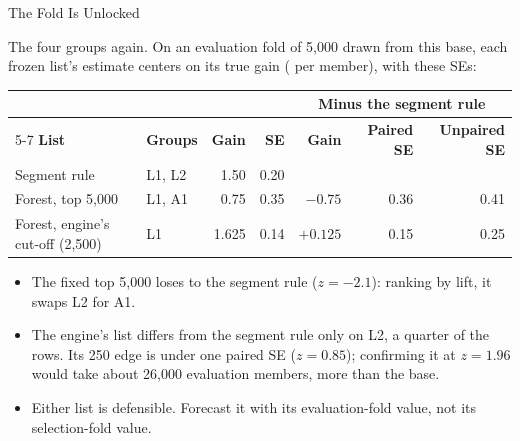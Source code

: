 \documentclass[aspectratio=169, 11pt, handout]{beamer}
\begin{document}
\begin{frame}{The Fold Is Unlocked}

The four groups again. On an evaluation fold of 5{,}000 drawn from this base, each frozen list's estimate centers on its true gain (\textyen{} per member), with these SEs:

\begin{center}
\small
\begin{tabular}{llrrrrr}
\toprule
& & & & \multicolumn{3}{c}{\textbf{Minus the segment rule}} \\
\cmidrule(lr){5-7}
\textbf{List} & \textbf{Groups} & \textbf{Gain} & \textbf{SE} & \textbf{Gain} & \textbf{Paired SE} & \textbf{Unpaired SE} \\
\midrule
Segment rule & L1, L2 & 1.50 & 0.20 & & & \\
Forest, top 5{,}000 & L1, A1 & 0.75 & 0.35 & $-0.75$ & 0.36 & 0.41 \\
Forest, engine's cut-off (2{,}500) & L1 & 1.625 & 0.14 & $+0.125$ & 0.15 & 0.25 \\
\bottomrule
\end{tabular}
\end{center}

\begin{itemize}
  \item The fixed top 5{,}000 loses to the segment rule ($z = -2.1$): ranking by lift, it swaps L2 for A1.
  \item The engine's list differs from the segment rule only on L2, a quarter of the rows. Its 250 edge is under one paired SE ($z = 0.85$); confirming it at $z = 1.96$ would take about 26{,}000 evaluation members, more than the base.
  \item Either list is defensible. Forecast it with its evaluation-fold value, not its selection-fold value.
\end{itemize}
\end{frame}
\end{document}
